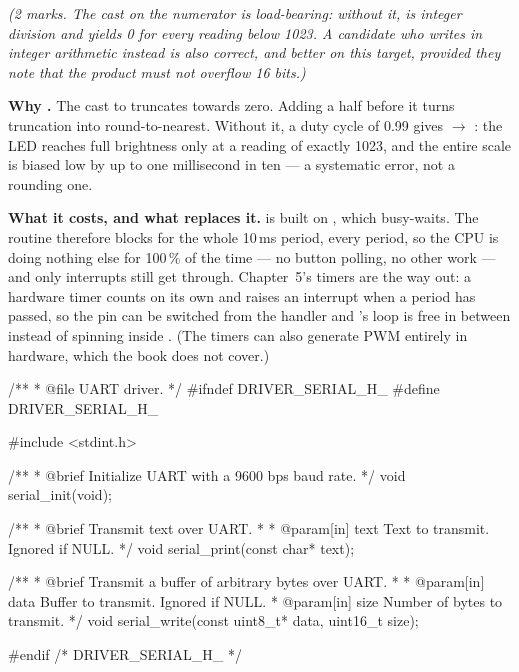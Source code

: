 {\itshape (2 marks. The cast on the numerator is load-bearing: without it, 
is integer division and yields 0 for every reading below 1023. A candidate who writes
 in integer arithmetic instead is also correct, and
better on this target, provided they note that the product must not overflow 16 bits.)\par}

\medskip \textbf{Why .} The cast to  truncates towards zero. Adding a
half before it turns truncation into round-to-nearest. Without it, a duty cycle of 0.99 gives
 $\rightarrow$ : the LED reaches full brightness only at a reading of exactly
1023, and the entire scale is biased low by up to one millisecond in ten --- a systematic error, not
a rounding one. 

\textbf{What it costs, and what replaces it.}  is built on ,
which busy-waits. The routine therefore blocks for the whole 10\,ms period, every period, so the CPU
is doing nothing else for 100\,\% of the time --- no button polling, no other work --- and only
interrupts still get through. Chapter~5's timers are the way out: a hardware timer counts on its own
and raises an interrupt when a period has passed, so the pin can be switched from the handler and
's loop is free in between instead of spinning inside . (The timers
can also generate PWM entirely in hardware, which the book does not cover.) 


\begin{ccode}
/**
 * @file UART driver.
 */
#ifndef DRIVER_SERIAL_H_
#define DRIVER_SERIAL_H_

#include <stdint.h>

/**
 * @brief Initialize UART with a 9600 bps baud rate.
 */
void serial_init(void);

/**
 * @brief Transmit text over UART.
 *
 * @param[in] text Text to transmit. Ignored if NULL.
 */
void serial_print(const char* text);

/**
 * @brief Transmit a buffer of arbitrary bytes over UART.
 *
 * @param[in] data Buffer to transmit. Ignored if NULL.
 * @param[in] size Number of bytes to transmit.
 */
void serial_write(const uint8_t* data, uint16_t size);

#endif /* DRIVER_SERIAL_H_ */
\end{ccode}

